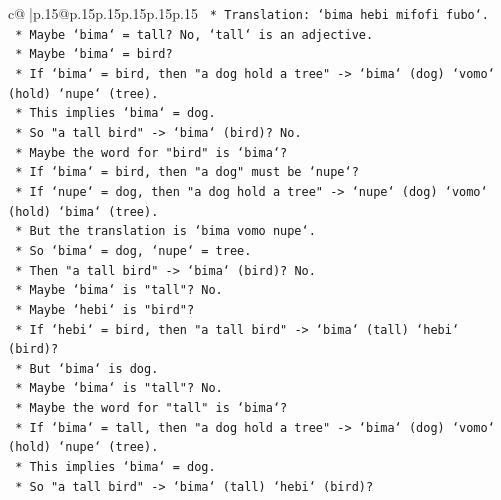 \documentclass{article}
\begin{document}
{\begin{supertabular}{c@{$\;$}|p{.15\linewidth}@{}p{.15\linewidth}p{.15\linewidth}p{.15\linewidth}p{.15\linewidth}p{.15\linewidth}}
{{{\texttt{                            *   Translation: `bima hebi mifofi fubo`.} \\
\texttt{                            *   Maybe `bima` = tall? No, `tall` is an adjective.} \\
\texttt{                            *   Maybe `bima` = bird?} \\
\texttt{                            *   If `bima` = bird, then "a dog hold a tree" {-}> `bima` (dog) `vomo` (hold) `nupe` (tree).} \\
\texttt{                            *   This implies `bima` = dog.} \\
\texttt{                            *   So "a tall bird" {-}> `bima` (bird)? No.} \\
\texttt{                            *   Maybe the word for "bird" is `bima`?} \\
\texttt{                            *   If `bima` = bird, then "a dog" must be `nupe`?} \\
\texttt{                            *   If `nupe` = dog, then "a dog hold a tree" {-}> `nupe` (dog) `vomo` (hold) `bima` (tree).} \\
\texttt{                            *   But the translation is `bima vomo nupe`.} \\
\texttt{                            *   So `bima` = dog, `nupe` = tree.} \\
\texttt{                            *   Then "a tall bird" {-}> `bima` (bird)? No.} \\
\texttt{                            *   Maybe `bima` is "tall"? No.} \\
\texttt{                            *   Maybe `hebi` is "bird"?} \\
\texttt{                            *   If `hebi` = bird, then "a tall bird" {-}> `bima` (tall) `hebi` (bird)?} \\
\texttt{                            *   But `bima` is dog.} \\
\texttt{                            *   Maybe `bima` is "tall"? No.} \\
\texttt{                            *   Maybe the word for "tall" is `bima`?} \\
\texttt{                            *   If `bima` = tall, then "a dog hold a tree" {-}> `bima` (dog) `vomo` (hold) `nupe` (tree).} \\
\texttt{                            *   This implies `bima` = dog.} \\
\texttt{                            *   So "a tall bird" {-}> `bima` (tall) `hebi` (bird)?} \\
}}}
\end{supertabular}}
\end{document}
